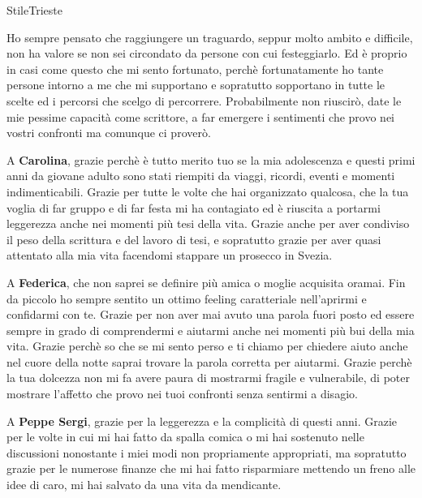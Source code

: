 \documentclass[cucitura%
,12pt%
]{toptesi}
\begin{document}
%



\expandafter\ifx\csname StileTrieste\endcsname\relax
    \frontespizio
\else
    \paginavuota
    \tomo
\fi






\ringraziamenti

Ho sempre pensato che raggiungere un traguardo, seppur molto ambito e difficile, non ha valore se non sei circondato da persone con cui festeggiarlo. Ed è proprio
in casi come questo che mi sento fortunato, perchè fortunatamente ho tante persone intorno a me che mi supportano e sopratutto sopportano in tutte le scelte ed i percorsi che scelgo 
di percorrere. Probabilmente non riuscirò, date le mie pessime capacità come scrittore, a far emergere i sentimenti che provo nei vostri confronti ma comunque ci proverò.



A \textbf{Carolina}, grazie perchè è tutto merito tuo se la mia adolescenza e questi primi anni da giovane adulto sono stati riempiti da viaggi, ricordi, eventi e momenti indimenticabili. Grazie per tutte le volte
che hai organizzato qualcosa, che la tua voglia di far gruppo e di far festa mi ha contagiato ed è riuscita a portarmi leggerezza anche nei momenti più tesi della vita. Grazie anche per aver condiviso il peso 
della scrittura e del lavoro di tesi, e sopratutto grazie per aver quasi attentato alla mia vita facendomi stappare un prosecco in Svezia.

A \textbf{Federica}, che non saprei se definire più amica o moglie acquisita oramai. Fin da piccolo ho sempre sentito un ottimo feeling caratteriale nell'aprirmi e confidarmi con te. Grazie per non aver mai avuto una parola
fuori posto ed essere sempre in grado di comprendermi e aiutarmi anche nei momenti più bui della mia vita. Grazie perchè so che se mi sento perso e ti chiamo per chiedere aiuto anche nel cuore della notte saprai trovare la parola
corretta per aiutarmi. Grazie perchè la tua dolcezza non mi fa avere paura di mostrarmi fragile e vulnerabile, di poter mostrare l'affetto che provo nei tuoi confronti senza sentirmi a disagio.

A \textbf{Peppe Sergi}, grazie per la leggerezza e la complicità di questi anni. Grazie per le volte in cui mi hai fatto da spalla comica o mi hai sostenuto nelle discussioni nonostante i miei modi non propriamente appropriati,
ma sopratutto grazie per le numerose finanze che mi hai fatto risparmiare mettendo un freno alle idee di caro, mi hai salvato da una vita da mendicante.
\end{document}
